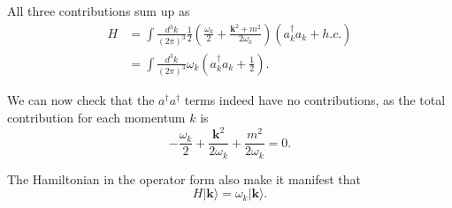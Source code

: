 All three contributions sum up as
\begin{equation}
\begin{aligned}
	H &= \int \frac{d^3 k}{(2\pi)^3} \frac{1}{2}\left(\frac{\omega_k}{2} + \frac{\bm k^2+m^2}{2 \omega_k}\right) \left(a_k^\dagger a_k + h.c. \right) \\
	&= \int \frac{d^3 k}{(2\pi)^3} \omega_k \left(a_k^\dagger a_k +\frac{1}{2} \right).
\end{aligned}
\end{equation}

We can now check that the $a^\dagger a^\dagger$ terms indeed have no contributions, as the total contribution for each momentum $k$ is
\begin{equation}
	-\frac{\omega_k}{2} + \frac{\bm k^2}{2\omega_k} + \frac{m^2}{2\omega_k} = 0.
\end{equation}

The Hamiltonian in the operator form also make it manifest that
\begin{equation}
	H |\bm k\rangle = \omega_k |\bm k\rangle.
\end{equation}




